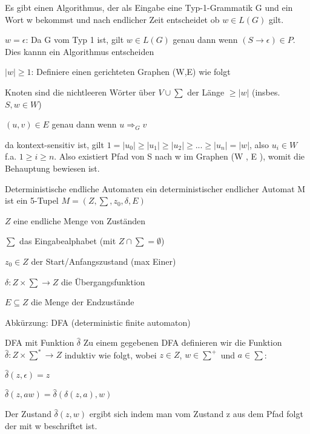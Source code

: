 \documentclass[avery5371, frame]{flashcards}
\begin{document}
\begin{flashcard}[Beweise]{Es gibt einen Algorithmus, der als Eingabe eine Typ-1-Grammatik G und ein Wort w bekommst und nach endlicher Zeit entscheidet ob $w\in L(G)$ gilt.}
    \scriptsize{
        \begin{enumerate*}
            \item $w=\epsilon$: Da G vom Typ 1 ist, gilt $w\in L(G)$ genau dann wenn $(S\rightarrow \epsilon)\in P$. Dies kannn ein Algorithmus entscheiden
            \item $|w|\geq 1$: Definiere einen gerichteten Graphen (W,E) wie folgt
            \begin{itemize*}
                \item Knoten sind die nichtleeren Wörter über $V\cup\sum$ der Länge $\geq|w|$ (insbes. $S,w \in W$)
                \item $(u,v)\in E$ genau dann wenn $u\Rightarrow_G v$
            \end{itemize*}
            da kontext-sensitiv ist, gilt $1 = |u_0|\geq |u_1|\geq |u_2|\geq...\geq |u_n| = |w|$, also $u_i\in W$  f.a. $1\geq i \geq n$. Also existiert Pfad von S nach w im Graphen (W , E ), womit die Behauptung bewiesen ist.
        \end{enumerate*}
    }
\end{flashcard}

\begin{flashcard}[Definition]{Deterministische endliche Automaten}
    ein deterministischer endlicher Automat M ist ein 5-Tupel $M=(Z, \sum, z_0, \delta, E)$
    \begin{itemize*}
        \item $Z$ eine endliche Menge von Zuständen
        \item $\sum$ das Eingabealphabet (mit $Z\cap\sum = \emptyset$)
        \item $z_0\in Z$ der Start/Anfangszustand (max Einer)
        \item $\delta: Z \times \sum \rightarrow Z$ die Übergangsfunktion
        \item $E\subseteq Z$ die Menge der Endzustände
    \end{itemize*}
    Abkürzung: DFA (deterministic finite automaton)
\end{flashcard}

\begin{flashcard}[Definition]{DFA mit Funktion $\hat{\delta}$}
    Zu einem gegebenen DFA definieren wir die Funktion $\hat{\delta}: Z \times \sum^* \rightarrow Z$ induktiv wie folgt, wobei $z\in Z$, $w\in\sum^+$ und $a\in \sum$:
    \begin{itemize*}
        \item $\hat{\delta}(z, \epsilon) = z$
        \item $\hat{\delta}(z,aw)= \hat{\delta}(\delta(z,a),w)$
    \end{itemize*}
    Der Zustand $\hat{\delta}(z,w)$ ergibt sich indem man vom Zustand z aus dem Pfad folgt der mit w beschriftet ist.
\end{flashcard}
\end{document}

